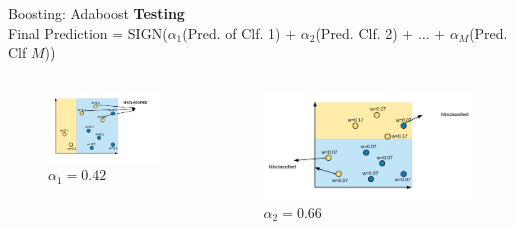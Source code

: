 \documentclass{beamer}
\begin{document}
	\begin{frame}{Boosting: Adaboost}
	\textbf{Testing}\\
\pause	Final Prediction = SIGN($\alpha_1$(Pred. of Clf. 1) +  $\alpha_2$(Pred. Clf. 2) + $\dots$ +  $\alpha_M$(Pred. Clf $M$))
	
	\begin{columns}
	\pause 			\begin{column}{0.33\textwidth}
			\centering
			\begin{figure}
				\includegraphics[width = \textwidth]{ada_iter1_misclassify}
								\vspace{-20pt}
				\caption{$\alpha_1=0.42$}
			\end{figure}
			
		\end{column}
		
		
		\pause \begin{column}{0.4\textwidth}
			\centering
			\begin{figure}
				\includegraphics[width = \textwidth]{ada_iter2_misclassify}
				\vspace{-20pt}
				\caption{$\alpha_2=0.66$}
			\end{figure}


\end{column}
\end{columns}
\end{frame}
\end{document}
